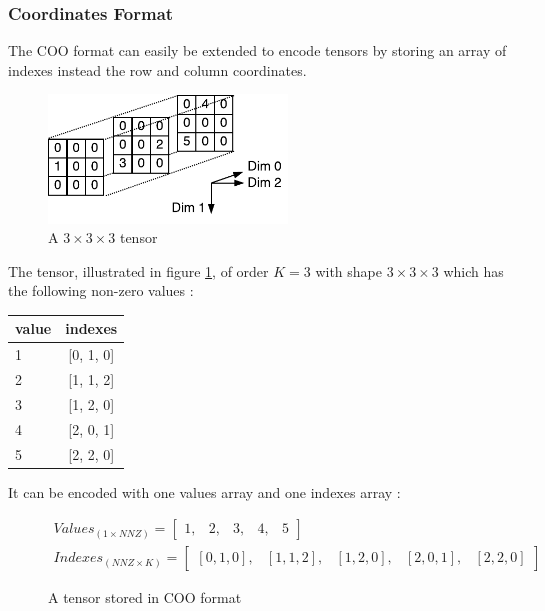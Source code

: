 \subsubsection{Coordinates Format} \label{sssec:coo}
The COO format can easily be extended to encode tensors by storing an array of indexes instead the row and column coordinates. 

\begin{figure}[h]
	\begin{center}
		\includegraphics[width=2.5in]{images/tensorscooexpl.pdf} 
		\caption{A $3\times 3\times 3$ tensor}
        \label{fig:tensorCOO}
	\end{center}
\end{figure}
The tensor, illustrated in figure \ref{fig:tensorCOO}, of order $K = 3$ with shape $3\times 3 \times 3$ which has the following non-zero values :
\begin{center}
	\begin{tabular}{ l | c  }
		value & indexes\\ \hline
		1 & [0, 1, 0]\\ \hline
		2 & [1, 1, 2] \\ \hline
		3 & [1, 2, 0] \\ \hline
		4 & [2, 0, 1] \\ \hline
		5 & [2, 2, 0] \\ 
		
	\end{tabular}
\end{center}

It can be encoded with one values array and one indexes array :
\begin{figure}[h]
	\[
	\begin{aligned}
	Values_{(1\times NNZ)} = 
	\begin{bmatrix}
	1, &  2, & 3, & 4, & 5
	\end{bmatrix}
	\\
	Indexes_{(NNZ \times K)} = 
	\begin{bmatrix}
	[0, 1, 0] ,&  [1, 1, 2], & [1, 2, 0], & [2, 0, 1], & [2, 2, 0]
	\end{bmatrix}
	\end{aligned}
	\]
	\caption{A tensor stored in COO format}
		\label{fig:cooformattensor}
\end{figure}

